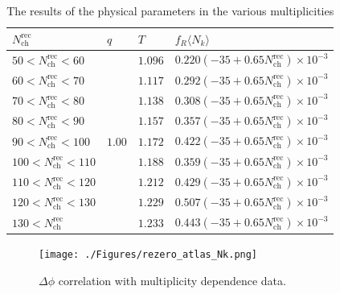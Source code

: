 \documentclass[jkps,fleqn,showpacs,showkeys]{revtex4}
\begin{document}
\begin{table}[ht]
  \renewcommand{\arraystretch}{1.5}
  \begin{tabular}{C{3cm} | C{1.5cm} | C{1.5cm} | C{6cm}}
  \hline
  $N_{\text{ch}}^{\text{rec}}$         &  $q$   &   $T$   & $f_R\langle N_k \rangle$ \\ \hline\hline
  $50<N_{\text{ch}}^{\text{rec}}<60$   &        & $1.096$ & $0.220(-35+0.65N_{\text{ch}}^{\text{rec}})\times10^{-3}$ \\   
  $60<N_{\text{ch}}^{\text{rec}}<70$   &        & $1.117$ & $0.292(-35+0.65N_{\text{ch}}^{\text{rec}})\times10^{-3}$ \\   
  $70<N_{\text{ch}}^{\text{rec}}<80$   &        & $1.138$ & $0.308(-35+0.65N_{\text{ch}}^{\text{rec}})\times10^{-3}$ \\   
  $80<N_{\text{ch}}^{\text{rec}}<90$   &        & $1.157$ & $0.357(-35+0.65N_{\text{ch}}^{\text{rec}})\times10^{-3}$ \\   
  $90<N_{\text{ch}}^{\text{rec}}<100$  & $1.00$ & $1.172$ & $0.422(-35+0.65N_{\text{ch}}^{\text{rec}})\times10^{-3}$ \\   
  $100<N_{\text{ch}}^{\text{rec}}<110$ &        & $1.188$ & $0.359(-35+0.65N_{\text{ch}}^{\text{rec}})\times10^{-3}$ \\   
  $110<N_{\text{ch}}^{\text{rec}}<120$ &        & $1.212$ & $0.429(-35+0.65N_{\text{ch}}^{\text{rec}})\times10^{-3}$ \\   
  $120<N_{\text{ch}}^{\text{rec}}<130$ &        & $1.229$ & $0.507(-35+0.65N_{\text{ch}}^{\text{rec}})\times10^{-3}$ \\   
  $130<N_{\text{ch}}^{\text{rec}}$     &        & $1.233$ & $0.443(-35+0.65N_{\text{ch}}^{\text{rec}})\times10^{-3}$ \\ \hline
  \end{tabular}
  \caption{The results of the physical parameters in the various multiplicities}
  \label{table:variousmulti}
\end{table}

\begin{figure}[ht]
\centering
\texttt{[image: ./Figures/rezero\_atlas\_Nk.png]}
\caption{$\Delta \phi$ correlation with multiplicity dependence data.}
\label{figure:multiplicity}
\end{figure}
    
\end{document}

